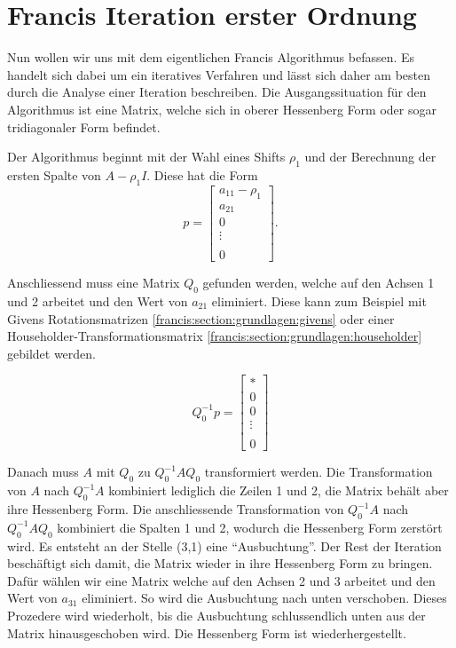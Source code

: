 \section{Francis Iteration erster Ordnung\label{francis:section:francis_iteration}}

Nun wollen wir uns mit dem eigentlichen Francis Algorithmus \cite{francis:watkins_book} befassen.
Es handelt sich dabei um ein iteratives Verfahren und lässt sich daher am besten durch die Analyse einer Iteration beschreiben.
Die Ausgangssituation für den Algorithmus ist eine Matrix, welche sich in oberer Hessenberg Form oder sogar tridiagonaler Form befindet.

Der Algorithmus beginnt mit der Wahl eines Shifts $\rho_{1}$ und der Berechnung der ersten Spalte von $A-\rho_{1} I$. 
Diese hat die Form
\begin{equation}
	p=\begin{bmatrix}
	a_{11}-\rho_{1}\\
	a_{21}\\
	0\\
	\vdots\\
	\\
	0
	\end{bmatrix}.
\end{equation}

Anschliessend muss eine Matrix $Q_{0}$ gefunden werden, welche auf den Achsen 1 und 2 arbeitet und den Wert von $a_{21}$ eliminiert. Diese kann zum Beispiel mit Givens Rotationsmatrizen \ref{francis:section:grundlagen:givens} oder einer Householder-Transformationsmatrix \ref{francis:section:grundlagen:householder} gebildet werden.

\begin{equation}
	Q_{0}^{-1}p=\begin{bmatrix}
	*\\
	0\\
	0\\
	\vdots\\
	\\
	0
	\end{bmatrix}
\end{equation}

Danach muss $A$ mit $Q_{0}$ zu  $Q_{0}^{-1}AQ_{0}$ transformiert werden.
Die Transformation von $A$ nach $Q_{0}^{-1}A$ kombiniert lediglich die Zeilen 1 und 2, die Matrix behält aber ihre Hessenberg Form.
Die anschliessende Transformation von $Q_{0}^{-1}A$ nach $Q_{0}^{-1}AQ_{0}$ kombiniert die Spalten 1 und 2, wodurch die Hessenberg Form zerstört wird.
Es entsteht an der Stelle (3,1) eine "`Ausbuchtung"'.
Der Rest der Iteration beschäftigt sich damit, die Matrix wieder in ihre Hessenberg Form zu bringen.
Dafür wählen wir eine Matrix welche auf den Achsen 2 und 3 arbeitet und den Wert von $a_{31}$ eliminiert.
So wird die Ausbuchtung nach unten verschoben.
Dieses Prozedere wird wiederholt, bis die Ausbuchtung schlussendlich unten aus der Matrix hinausgeschoben wird.
Die Hessenberg Form ist wiederhergestellt.


